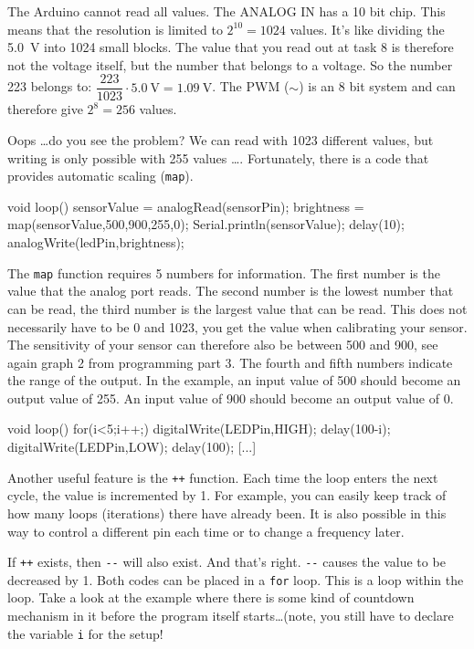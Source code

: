 \documentclass{arduino}
\begin{document}

The Arduino cannot read all values. The ANALOG IN has a 10 bit chip. This means that the resolution is limited to $ 2^{10} = 1024 $ values. It's like dividing the \SI{5.0}{\volt} into 1024 small blocks. The value that you read out at task 8 is therefore not the voltage itself, but the number that belongs to a voltage. So the number 223 belongs to: $ \dfrac{223}{1023} \cdot \SI{5.0}{\volt} = \SI{1.09}{\volt} $. The PWM ($\sim$) is an 8 bit system and can therefore give $ 2^8 = 256 $ values.

Oops \dots do you see the problem? We can read with 1023 different values, but writing is only possible with 255 values ​​\dots. Fortunately, there is a code that provides automatic scaling (\lstinline{map}).

\begin{marginlisting}
void loop() {
  sensorValue = analogRead(sensorPin);
  brightness = map(sensorValue,500,900,255,0);
  Serial.println(sensorValue);
  delay(10);
  analogWrite(ledPin,brightness);
}
\end{marginlisting}
The \lstinline{map} function requires 5 numbers for information. The first number is the value that the analog port reads. The second number is the lowest number that can be read, the third number is the largest value that can be read. This does not necessarily have to be 0 and 1023, you get the value when calibrating your sensor. The sensitivity of your sensor can therefore also be between 500 and 900, see again graph 2 from programming part 3. The fourth and fifth numbers indicate the range of the output. In the example, an input value of 500 should become an output value of 255. An input value of 900 should become an output value of 0.

\begin{marginlisting}
void loop(){
  for(i<5;i++;) {
    digitalWrite(LEDPin,HIGH);
    delay(100-i);
    digitalWrite(LEDPin,LOW);
    delay(100);
  }
  [...]
}
\end{marginlisting}
Another useful feature is the \lstinline{++} function. Each time the loop enters the next cycle, the value is incremented by 1. For example, you can easily keep track of how many loops (iterations) there have already been. It is also possible in this way to control a different pin each time or to change a frequency later.

If \lstinline{++} exists, then \lstinline{--} will also exist. And that's right. \lstinline{--} causes the value to be decreased by 1. Both codes can be placed in a \lstinline{for} loop. This is a loop within the loop. Take a look at the example where there is some kind of countdown mechanism in it before the program itself starts\dots (note, you still have to declare the variable \lstinline{i} for the setup!
\end{document}
